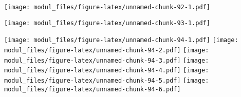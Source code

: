 \documentclass[
]{book}
\newenvironment{Shaded}{\begin{snugshade}}{\end{snugshade}}
\newcommand{\AttributeTok}[1]{\textcolor[rgb]{0.77,0.63,0.00}{#1}}
\newcommand{\CommentTok}[1]{\textcolor[rgb]{0.56,0.35,0.01}{\textit{#1}}}
\newcommand{\ControlFlowTok}[1]{\textcolor[rgb]{0.13,0.29,0.53}{\textbf{#1}}}
\newcommand{\DecValTok}[1]{\textcolor[rgb]{0.00,0.00,0.81}{#1}}
\newcommand{\FloatTok}[1]{\textcolor[rgb]{0.00,0.00,0.81}{#1}}
\newcommand{\FunctionTok}[1]{\textcolor[rgb]{0.00,0.00,0.00}{#1}}
\newcommand{\NormalTok}[1]{#1}
\newcommand{\OtherTok}[1]{\textcolor[rgb]{0.56,0.35,0.01}{#1}}
\newcommand{\SpecialCharTok}[1]{\textcolor[rgb]{0.00,0.00,0.00}{#1}}
\newcommand{\StringTok}[1]{\textcolor[rgb]{0.31,0.60,0.02}{#1}}
\begin{document}
\texttt{[image: modul\_files/figure-latex/unnamed-chunk-92-1.pdf]}

\begin{Shaded}
\end{Shaded}

\texttt{[image: modul\_files/figure-latex/unnamed-chunk-93-1.pdf]}

\begin{Shaded}
\end{Shaded}

\texttt{[image: modul\_files/figure-latex/unnamed-chunk-94-1.pdf]} \texttt{[image: modul\_files/figure-latex/unnamed-chunk-94-2.pdf]} \texttt{[image: modul\_files/figure-latex/unnamed-chunk-94-3.pdf]} \texttt{[image: modul\_files/figure-latex/unnamed-chunk-94-4.pdf]} \texttt{[image: modul\_files/figure-latex/unnamed-chunk-94-5.pdf]} \texttt{[image: modul\_files/figure-latex/unnamed-chunk-94-6.pdf]}
\end{document}
